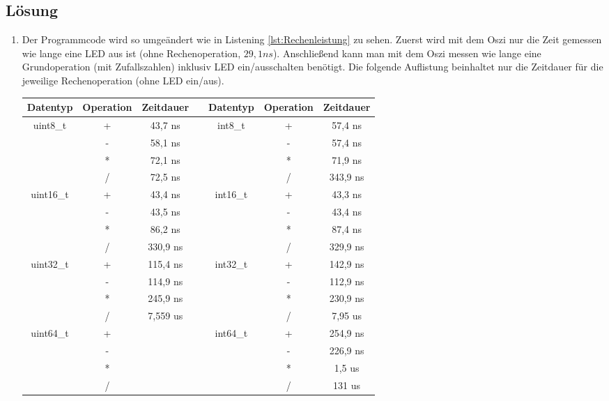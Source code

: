 \subsection{Lösung}
\begin{enumerate}
		\item 
		Der Programmcode wird so umgeändert wie in Listening  \ref{lst:Rechenleistung} zu sehen. Zuerst wird mit dem Oszi nur die Zeit gemessen wie lange eine LED aus ist (ohne Rechenoperation, $29,1 ns$). Anschließend kann man mit dem Oszi messen wie lange eine Grundoperation (mit Zufallszahlen) inklusiv LED ein/ausschalten benötigt. Die folgende Auflistung beinhaltet nur die Zeitdauer für die jeweilige Rechenoperation (ohne LED ein/aus).\newline
\begin{tabular}{|c|c|c|c|c|c|c|}
	\hline 
	Datentyp & Operation & Zeitdauer &  & Datentyp & Operation & Zeitdauer \\
	\hline
	
	\hline
	uint8\_t 	& + & 43,7 ns &  		& int8\_t 		& + & 57,4 ns \\ 
	\hline 
				& - & 58,1 ns &  		&  				& - & 57,4 ns \\ 
	\hline 
				& * & 72,1 ns &  		&  				& * & 71,9 ns \\ 
	\hline 
				& / & 72,5 ns &  		&  				& / & 343,9 ns \\ 
	\hline 

	\hline 
	uint16\_t 	& + & 43,4 ns &  		& int16\_t 		& + & 43,3 ns \\ 
	\hline 
				& - & 43,5 ns &  		&  				& - & 43,4 ns \\ 
	\hline 
				& * & 86,2 ns &  		&  				& * & 87,4 ns \\ 
	\hline 
				& / & 330,9 ns &  		&  				& / & 329,9 ns \\ 
	\hline

	\hline 
	uint32\_t 	& + & 115,4 ns &  		& int32\_t 		& + & 142,9 ns \\ 
	\hline 
				& - & 114,9 ns &  		&  				& - & 112,9 ns \\ 
	\hline 
				& * & 245,9 ns &  		&  				& * & 230,9 ns \\ 
	\hline 
				& / & 7,559 us &  		&  				& / & 7,95 us \\ 
	\hline

	\hline 
	uint64\_t 	& + &  &  		& int64\_t 		& + & 254,9 ns \\ 
	\hline 
				& - &  &  		&  				& - & 226,9 ns \\ 
	\hline 
				& * &  &  		&  				& * & 1,5 us \\ 
	\hline 
				& / &  &  		&  				& / & 131 us \\ 
	\hline


\end{tabular}
\end{enumerate}
